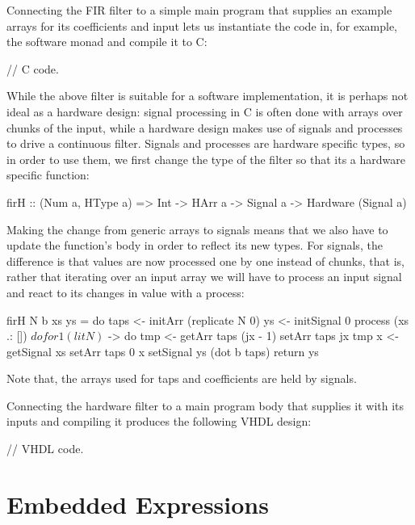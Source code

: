 \documentclass[../main.tex]{subfiles}
\begin{document}
Connecting the FIR filter to a simple main program that supplies an example arrays for its coefficients and input lets us instantiate the code in, for example, the software monad and compile it to C:

\begin{code}
// C code.
\end{code}

While the above filter is suitable for a software implementation, it is perhaps not ideal as a hardware design: signal processing in C is often done with arrays over chunks of the input, while a hardware design makes use of signals and processes to drive a continuous filter. Signals and processes are hardware specific types, so in order to use them, we first change the type of the filter so that its a hardware specific function:

\begin{code}
firH :: (Num a, HType a) => Int -> HArr a -> Signal a
     -> Hardware (Signal a)
\end{code}


Making the change from generic arrays to signals means that we also have to update the function's body in order to reflect its new types. For signals, the difference is that values are now processed one by one instead of chunks, that is, rather that iterating over an input array we will have to process an input signal and react to its changes in value with a process:

\begin{code}
firH N b xs ys = do
  taps <- initArr (replicate N 0)
  ys   <- initSignal 0
  process (xs .: []) $ do
    for 1 (lit N) $ \jx -> do
      tmp <- getArr taps (jx - 1)
      setArr taps jx tmp
    x <- getSignal xs
    setArr taps 0 x
    setSignal ys (dot b taps)
  return ys
\end{code}

\noindent Note that, the arrays used for taps and coefficients are held by signals.

Connecting the hardware filter to a main program body that supplies it with its inputs and compiling it produces the following VHDL design:

\begin{code}
// VHDL code.
\end{code}

\section{Embedded Expressions}
\label{expr}
\end{document}
